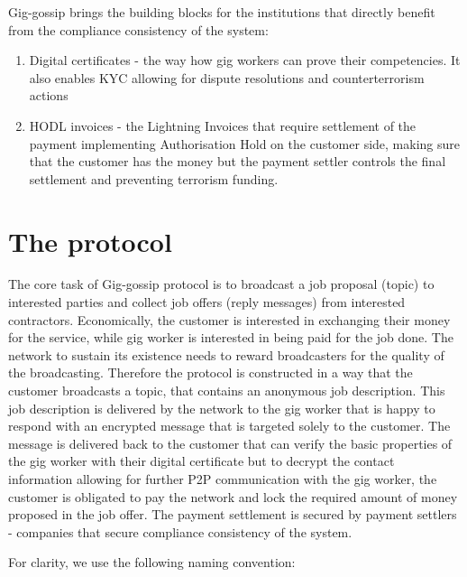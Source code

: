 \documentclass{article}
\begin{document}
Gig-gossip brings the building blocks for the institutions that directly benefit from the compliance consistency of the system:
\begin{enumerate}
	\item Digital certificates - the way how gig workers can prove their competencies. It also enables KYC allowing for dispute resolutions and counterterrorism actions 
	\item HODL invoices - the Lightning Invoices that require settlement of the payment implementing Authorisation Hold on the customer side, making sure that the customer has the money but the payment settler controls the final settlement and preventing terrorism funding.
\end{enumerate}
 
\section{The protocol}
The core task of Gig-gossip protocol is to broadcast a job proposal (topic) to interested parties and collect job offers (reply messages) from interested contractors. Economically, the customer is interested in exchanging their money for the service, while gig worker is interested in being paid for the job done. The network to sustain its existence needs to reward broadcasters for the quality of the broadcasting. Therefore the protocol is constructed in a way that the customer broadcasts a topic, that contains an anonymous job description. This job description is delivered by the network to the gig worker that is happy to respond with an encrypted message that is targeted solely to the customer. The message is delivered back to the customer that can verify the basic properties of the gig worker with their digital certificate but to decrypt the contact information allowing for further P2P communication with the gig worker, the customer is obligated to pay the network and lock the required amount of money proposed in the job offer. The payment settlement is secured by payment settlers - companies that secure compliance consistency of the system.

For clarity, we use the following naming convention:
\end{document}
